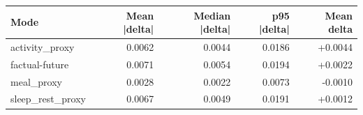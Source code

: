\begin{tabular}{lrrrr}
\toprule
Mode & Mean |delta| & Median |delta| & p95 |delta| & Mean delta \\
\midrule
activity\_proxy & 0.0062 & 0.0044 & 0.0186 & +0.0044 \\
factual-future & 0.0071 & 0.0054 & 0.0194 & +0.0022 \\
meal\_proxy & 0.0028 & 0.0022 & 0.0073 & -0.0010 \\
sleep\_rest\_proxy & 0.0067 & 0.0049 & 0.0191 & +0.0012 \\
\bottomrule
\end{tabular}
